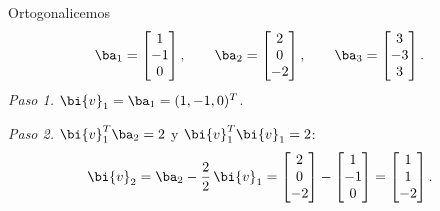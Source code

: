 \begin{ejemplo}\label{ej:gs}
Ortogonalicemos
\[
\ba_1=\begin{bmatrix}1\\-1\\0\end{bmatrix},\qquad
\ba_2=\begin{bmatrix}2\\0\\-2\end{bmatrix},\qquad
\ba_3=\begin{bmatrix}3\\-3\\3\end{bmatrix}.
\]
\emph{Paso 1.} $\bi{v}_1=\ba_1=(1,-1,0)^T$.

\emph{Paso 2.} $\bi{v}_1^T\ba_2=2$ y $\bi{v}_1^T\bi{v}_1=2$:
\[
\bi{v}_2=\ba_2-\frac{2}{2}\,\bi{v}_1
=\begin{bmatrix}2\\0\\-2\end{bmatrix}-\begin{bmatrix}1\\-1\\0\end{bmatrix}
=\begin{bmatrix}1\\1\\-2\end{bmatrix}.
\]


\end{ejemplo}
